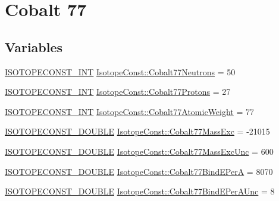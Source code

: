\hypertarget{group___isotope_const-_cobalt-_co77}{}\section{Cobalt 77}
\label{group___isotope_const-_cobalt-_co77}
\subsection*{Variables}
\begin{DoxyCompactItemize}
\item 
\mbox{\hyperlink{group___isotope_const-_macros_ga5f18360b3e99483a35c32d789e62621c}{I\+S\+O\+T\+O\+P\+E\+C\+O\+N\+S\+T\+\_\+\+I\+NT}} \mbox{\hyperlink{group___isotope_const-_cobalt-_co77_ga92816c50eddaeee60163e0d61d84ecd2}{Isotope\+Const\+::\+Cobalt77\+Neutrons}} = 50
\item 
\mbox{\hyperlink{group___isotope_const-_macros_ga5f18360b3e99483a35c32d789e62621c}{I\+S\+O\+T\+O\+P\+E\+C\+O\+N\+S\+T\+\_\+\+I\+NT}} \mbox{\hyperlink{group___isotope_const-_cobalt-_co77_ga575b894e879679d85e6225584c490ee1}{Isotope\+Const\+::\+Cobalt77\+Protons}} = 27
\item 
\mbox{\hyperlink{group___isotope_const-_macros_ga5f18360b3e99483a35c32d789e62621c}{I\+S\+O\+T\+O\+P\+E\+C\+O\+N\+S\+T\+\_\+\+I\+NT}} \mbox{\hyperlink{group___isotope_const-_cobalt-_co77_gaa9cc1918935c15b1644fc905793c43db}{Isotope\+Const\+::\+Cobalt77\+Atomic\+Weight}} = 77
\item 
\mbox{\hyperlink{group___isotope_const-_macros_ga8f45a7272ce02c0b4c65c44636ed719a}{I\+S\+O\+T\+O\+P\+E\+C\+O\+N\+S\+T\+\_\+\+D\+O\+U\+B\+LE}} \mbox{\hyperlink{group___isotope_const-_cobalt-_co77_ga02a90ea1dac9d979d8f054ab9087f450}{Isotope\+Const\+::\+Cobalt77\+Mass\+Exc}} = -\/21015
\item 
\mbox{\hyperlink{group___isotope_const-_macros_ga8f45a7272ce02c0b4c65c44636ed719a}{I\+S\+O\+T\+O\+P\+E\+C\+O\+N\+S\+T\+\_\+\+D\+O\+U\+B\+LE}} \mbox{\hyperlink{group___isotope_const-_cobalt-_co77_gaf3ab69df851e8617e3950abb227a65b9}{Isotope\+Const\+::\+Cobalt77\+Mass\+Exc\+Unc}} = 600
\item 
\mbox{\hyperlink{group___isotope_const-_macros_ga8f45a7272ce02c0b4c65c44636ed719a}{I\+S\+O\+T\+O\+P\+E\+C\+O\+N\+S\+T\+\_\+\+D\+O\+U\+B\+LE}} \mbox{\hyperlink{group___isotope_const-_cobalt-_co77_gac554304c415520cb6d50227bdb68722a}{Isotope\+Const\+::\+Cobalt77\+Bind\+E\+PerA}} = 8070
\item 
\mbox{\hyperlink{group___isotope_const-_macros_ga8f45a7272ce02c0b4c65c44636ed719a}{I\+S\+O\+T\+O\+P\+E\+C\+O\+N\+S\+T\+\_\+\+D\+O\+U\+B\+LE}} \mbox{\hyperlink{group___isotope_const-_cobalt-_co77_ga87c22bf2d6d9f2d0bc98cf04ba40f49d}{Isotope\+Const\+::\+Cobalt77\+Bind\+E\+Per\+A\+Unc}} = 8

\end{DoxyCompactItemize}
